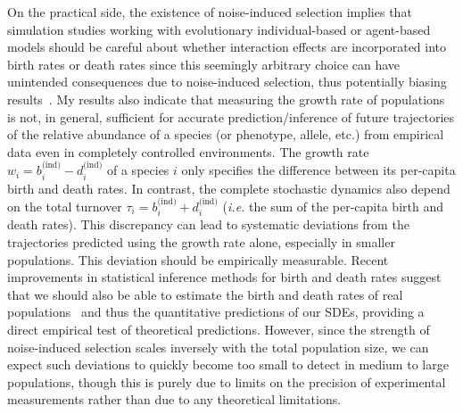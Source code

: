 On the practical side, the existence of noise-induced selection implies that simulation studies working with evolutionary individual-based or agent-based models should be careful about whether interaction effects are incorporated into birth rates or death rates since this seemingly arbitrary choice can have unintended consequences due to noise-induced selection, thus potentially biasing results~\citep{mcleod_social_2019,kuosmanen_turnover_2022}. My results also indicate that measuring the growth rate of populations is not, in general, sufficient for accurate prediction/inference of future trajectories of the relative abundance of a species (or phenotype, allele, etc.) from empirical data even in completely controlled environments. The growth rate $w_i = b^{\textrm{(ind)}}_{i} - d^{\textrm{(ind)}}_{i}$ of a species $i$ only specifies the difference between its per-capita birth and death rates. In contrast, the complete stochastic dynamics also depend on the total turnover $\tau_i = b^{\textrm{(ind)}}_{i} + d^{\textrm{(ind)}}_{i}$ (\emph{i.e.} the sum of the per-capita birth and death rates). This discrepancy can lead to systematic deviations from the trajectories predicted using the growth rate alone, especially in smaller populations. This deviation should be empirically measurable. Recent improvements in statistical inference methods for birth and death rates suggest that we should also be able to estimate the birth and death rates of real populations~\citep{huynh_inferring_2023} and thus the quantitative predictions of our SDEs, providing a direct empirical test of theoretical predictions. However, since the strength of noise-induced selection scales inversely with the total population size, we can expect such deviations to quickly become too small to detect in medium to large populations, though this is purely due to limits on the precision of experimental measurements rather than due to any theoretical limitations.

